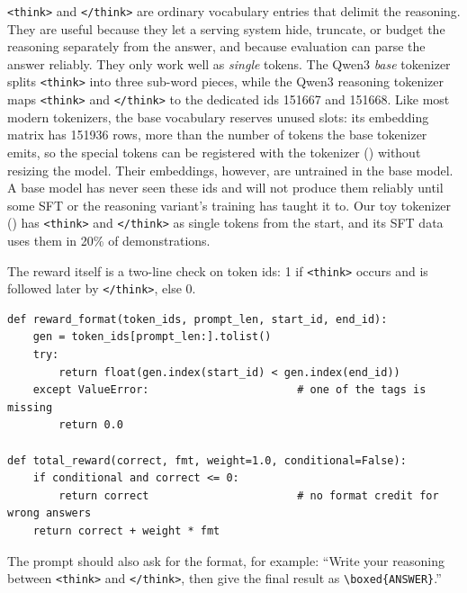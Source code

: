 \verb|<think>| and \verb|</think>| are ordinary vocabulary entries that delimit the
reasoning. They are useful because they let a serving system hide, truncate, or budget the
reasoning separately from the answer, and because evaluation can parse the answer reliably.
They only work well as \emph{single} tokens. The Qwen3 \emph{base} tokenizer splits
\verb|<think>| into three sub-word pieces, while the Qwen3 reasoning tokenizer maps
\verb|<think>| and \verb|</think>| to the dedicated ids \num{151667} and \num{151668}. Like
most modern tokenizers, the base vocabulary reserves unused slots: its embedding matrix has
\num{151936} rows, more than the number of tokens the base tokenizer emits, so the special
tokens can be registered with the tokenizer () without resizing the
model. Their embeddings, however, are untrained in the base model. A base model has never seen
these ids and will not produce them reliably until some SFT or the reasoning variant's
training has taught it to. Our toy tokenizer () has \verb|<think>| and
\verb|</think>| as single tokens from the start, and its SFT data uses them in 20\% of
demonstrations.

The reward itself is a two-line check on token ids: 1 if \verb|<think>| occurs and is
followed later by \verb|</think>|, else 0.

\begin{lstlisting}[caption={A token-level format reward and its combination with correctness.},label={lst:grpo2:format}]
def reward_format(token_ids, prompt_len, start_id, end_id):
    gen = token_ids[prompt_len:].tolist()
    try:
        return float(gen.index(start_id) < gen.index(end_id))
    except ValueError:                       # one of the tags is missing
        return 0.0

def total_reward(correct, fmt, weight=1.0, conditional=False):
    if conditional and correct <= 0:
        return correct                       # no format credit for wrong answers
    return correct + weight * fmt
\end{lstlisting}

The prompt should also ask for the format, for example: ``Write your reasoning between
\verb|<think>| and \verb|</think>|, then give the final result as \verb|\boxed{ANSWER}|.''

